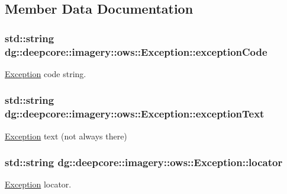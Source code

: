 \subsection{Member Data Documentation}
\subsubsection[{\texorpdfstring{exception\+Code}{exceptionCode}}]{\setlength{\rightskip}{0pt plus 5cm}std\+::string dg\+::deepcore\+::imagery\+::ows\+::\+Exception\+::exception\+Code}\hypertarget{structdg_1_1deepcore_1_1imagery_1_1ows_1_1_exception_a303c8746c8f2984f33932fbbe2dd6060}{}\label{structdg_1_1deepcore_1_1imagery_1_1ows_1_1_exception_a303c8746c8f2984f33932fbbe2dd6060}


\hyperlink{structdg_1_1deepcore_1_1imagery_1_1ows_1_1_exception}{Exception} code string. 

\subsubsection[{\texorpdfstring{exception\+Text}{exceptionText}}]{\setlength{\rightskip}{0pt plus 5cm}std\+::string dg\+::deepcore\+::imagery\+::ows\+::\+Exception\+::exception\+Text}\hypertarget{structdg_1_1deepcore_1_1imagery_1_1ows_1_1_exception_ab5a2f87d565041746d293c3969a08149}{}\label{structdg_1_1deepcore_1_1imagery_1_1ows_1_1_exception_ab5a2f87d565041746d293c3969a08149}


\hyperlink{structdg_1_1deepcore_1_1imagery_1_1ows_1_1_exception}{Exception} text (not always there) 

\subsubsection[{\texorpdfstring{locator}{locator}}]{\setlength{\rightskip}{0pt plus 5cm}std\+::string dg\+::deepcore\+::imagery\+::ows\+::\+Exception\+::locator}\hypertarget{structdg_1_1deepcore_1_1imagery_1_1ows_1_1_exception_a4dc321f3290f076b295511ceaba8738e}{}\label{structdg_1_1deepcore_1_1imagery_1_1ows_1_1_exception_a4dc321f3290f076b295511ceaba8738e}


\hyperlink{structdg_1_1deepcore_1_1imagery_1_1ows_1_1_exception}{Exception} locator. 

